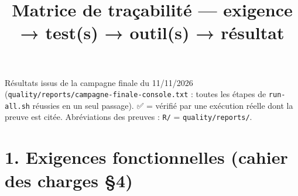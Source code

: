 \documentclass[
  11pt,
]{article}
\title{Matrice de traçabilité --- exigence → test(s) → outil(s) →
résultat}
\author{}
\date{}
\let\tdmorigine\tableofcontents
\renewcommand{\tableofcontents}{\tdmorigine\newpage}
\begin{document}
\maketitle

\renewcommand*\contentsname{Table des matières}
{
\hypersetup{linkcolor=}
\setcounter{tocdepth}{3}
\tableofcontents
}
Résultats issus de la campagne finale du 11/11/2026
(\texttt{quality/}\allowbreak{}\texttt{reports/}\allowbreak{}\texttt{campagne-}\allowbreak{}\texttt{finale-}\allowbreak{}\texttt{console.}\allowbreak{}\texttt{txt}
: toutes les étapes de \texttt{run-all.sh} réussies en un seul passage).
✅ = vérifié par une exécution réelle dont la preuve est citée.
Abréviations des preuves : \texttt{R/} = \texttt{quality/reports/}.

\section{1. Exigences fonctionnelles (cahier des charges
§4)}\label{1-exigences-fonctionnelles-cahier-des-charges-4}
\end{document}
